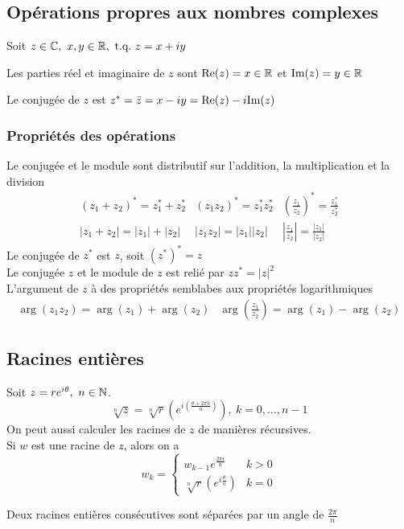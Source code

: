 \subsection{Opérations propres aux nombres complexes}
\noindent
Soit $z \in \C, \ x, y \in \R, \ \text{t.q.} \ z = x + iy$ 
\begin{definition}
    Les parties réel et imaginaire de $z$ sont $\text{Re}(z) = x \in \mathbb{R}$ et $\text{Im}(z) = y \in \mathbb{R}$
\end{definition}
\begin{definition}
    Le conjugée de $z$ est $z^* = \bar{z} = x - iy = \text{Re}(z) - i\text{Im}(z)$
\end{definition}

\subsubsection{Propriétés des opérations}
\noindent
Le conjugée et le module sont distributif sur l'addition, la multiplication et la division
\[
    \begin{matrix}
        \left(z_1 + z_2\right)^* = z_1^* + z_2^* & \left(z_1z_2\right)^* = z_1^{*} z_2^* & \left( \frac{z_1}{z_2}\right)^{*} = \frac{z_1^*}{z_2^*} \\[0.5em]
        \left|z_1 + z_2\right| = |z_1| + |z_2|   & \left|z_1z_2\right| = |z_1||z_2|      & \left| \frac{z_1}{z_2}\right| = \frac{|z_1|}{|z_2|}
    \end{matrix}
\]
Le conjugée de $z^*$ est $z$, soit $\left(z^*\right)^* = z$ \\
Le conjugée $z$ et le module de $z$ est relié par $zz^* = |z|^2$ \\
L'argument de $z$ à des propriétés semblabes aux propriétés logarithmiques
\[
    \begin{matrix}
        \arg(z_1z_2) = \arg(z_1) + \arg(z_2) & \arg\left( \frac{z_1}{z_2}\right) = \arg(z_1) - \arg(z_2)
    \end{matrix}
\]

\subsection{Racines entières}
\noindent
Soit $z = re^{i\theta},\ n \in \mathbb{N}$.
\[
    \sqrt[n]{z} = \sqrt[n]{r} \left( e^{i \left( \frac{\theta + 2\pi k}{n} \right) } \right), \ k = 0, \dots, n - 1
\]
On peut aussi calculer les racines de $z$ de manières récursives. \\
Si $w$ est une racine de $z$, alors on a
\[
    w_k = \begin{cases}
        w_{k - 1}e^{ \frac{2\pi i}{n} }                    & k > 0 \\[0.5em]
        \sqrt[n]{r} \left( e^{i \frac{\theta}{n} } \right) & k = 0
    \end{cases}
\]
\begin{remark}
    Deux racines entières consécutives sont séparées par un angle de $\frac{2\pi}{n}$
\end{remark}

